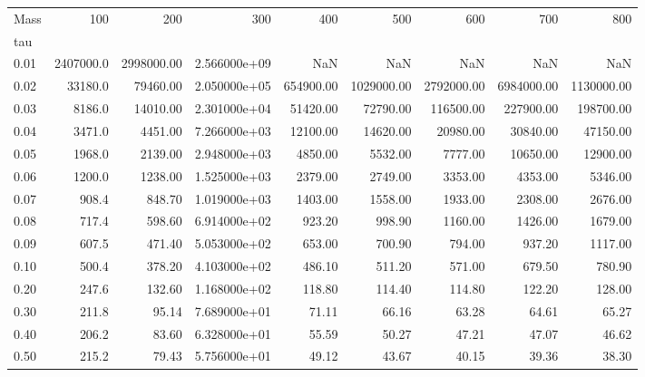 \begin{tabular}{lrrrrrrrr}
\toprule
Mass &        100 &         200 &           300 &        400 &         500 &         600 &         700 &         800 \\
tau   &            &             &               &            &             &             &             &             \\
\midrule
0.01  &  2407000.0 &  2998000.00 &  2.566000e+09 &        NaN &         NaN &         NaN &         NaN &         NaN \\
0.02  &    33180.0 &    79460.00 &  2.050000e+05 &  654900.00 &  1029000.00 &  2792000.00 &  6984000.00 &  1130000.00 \\
0.03  &     8186.0 &    14010.00 &  2.301000e+04 &   51420.00 &    72790.00 &   116500.00 &   227900.00 &   198700.00 \\
0.04  &     3471.0 &     4451.00 &  7.266000e+03 &   12100.00 &    14620.00 &    20980.00 &    30840.00 &    47150.00 \\
0.05  &     1968.0 &     2139.00 &  2.948000e+03 &    4850.00 &     5532.00 &     7777.00 &    10650.00 &    12900.00 \\
0.06  &     1200.0 &     1238.00 &  1.525000e+03 &    2379.00 &     2749.00 &     3353.00 &     4353.00 &     5346.00 \\
0.07  &      908.4 &      848.70 &  1.019000e+03 &    1403.00 &     1558.00 &     1933.00 &     2308.00 &     2676.00 \\
0.08  &      717.4 &      598.60 &  6.914000e+02 &     923.20 &      998.90 &     1160.00 &     1426.00 &     1679.00 \\
0.09  &      607.5 &      471.40 &  5.053000e+02 &     653.00 &      700.90 &      794.00 &      937.20 &     1117.00 \\
0.10  &      500.4 &      378.20 &  4.103000e+02 &     486.10 &      511.20 &      571.00 &      679.50 &      780.90 \\
0.20  &      247.6 &      132.60 &  1.168000e+02 &     118.80 &      114.40 &      114.80 &      122.20 &      128.00 \\
0.30  &      211.8 &       95.14 &  7.689000e+01 &      71.11 &       66.16 &       63.28 &       64.61 &       65.27 \\
0.40  &      206.2 &       83.60 &  6.328000e+01 &      55.59 &       50.27 &       47.21 &       47.07 &       46.62 \\
0.50  &      215.2 &       79.43 &  5.756000e+01 &      49.12 &       43.67 &       40.15 &       39.36 &       38.30 \\

\end{tabular}
